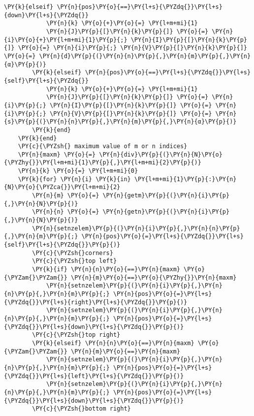 \begin{Verbatim}[commandchars=\\\{\}]
        \PY{k}{elseif} \PY{n}{pos}\PY{o}{==}\PY{l+s}{\PYZdq{}}\PY{l+s}{down}\PY{l+s}{\PYZdq{}}
            \PY{n}{k} \PY{o}{+}\PY{o}{=} \PY{l+m+mi}{1}
            \PY{n}{J}\PY{p}{[}\PY{n}{k}\PY{p}{]} \PY{o}{=} \PY{n}{i}\PY{o}{+}\PY{l+m+mi}{1}\PY{p}{;} \PY{n}{I}\PY{p}{[}\PY{n}{k}\PY{p}{]} \PY{o}{=} \PY{n}{i}\PY{p}{;} \PY{n}{V}\PY{p}{[}\PY{n}{k}\PY{p}{]} \PY{o}{=} \PY{n}{d}\PY{p}{(}\PY{n}{n}\PY{p}{,}\PY{n}{m}\PY{p}{,}\PY{n}{α}\PY{p}{)}
        \PY{k}{elseif} \PY{n}{pos}\PY{o}{==}\PY{l+s}{\PYZdq{}}\PY{l+s}{self}\PY{l+s}{\PYZdq{}}
            \PY{n}{k} \PY{o}{+}\PY{o}{=} \PY{l+m+mi}{1}
            \PY{n}{J}\PY{p}{[}\PY{n}{k}\PY{p}{]} \PY{o}{=} \PY{n}{i}\PY{p}{;} \PY{n}{I}\PY{p}{[}\PY{n}{k}\PY{p}{]} \PY{o}{=} \PY{n}{i}\PY{p}{;} \PY{n}{V}\PY{p}{[}\PY{n}{k}\PY{p}{]} \PY{o}{=} \PY{n}{s}\PY{p}{(}\PY{n}{n}\PY{p}{,}\PY{n}{m}\PY{p}{,}\PY{n}{α}\PY{p}{)}
        \PY{k}{end}
    \PY{k}{end}
    \PY{c}{\PYZsh{} maximum value of m or n indices}
    \PY{n}{maxm} \PY{o}{=} \PY{n}{div}\PY{p}{(}\PY{n}{N}\PY{o}{\PYZhy{}}\PY{l+m+mi}{1}\PY{p}{,}\PY{l+m+mi}{2}\PY{p}{)}
    \PY{n}{k} \PY{o}{=} \PY{l+m+mi}{0}
    \PY{k}{for} \PY{n}{i} \PY{k}{in} \PY{l+m+mi}{1}\PY{p}{:}\PY{n}{N}\PY{o}{\PYZca{}}\PY{l+m+mi}{2}
        \PY{n}{m} \PY{o}{=} \PY{n}{getm}\PY{p}{(}\PY{n}{i}\PY{p}{,}\PY{n}{N}\PY{p}{)}
        \PY{n}{n} \PY{o}{=} \PY{n}{getn}\PY{p}{(}\PY{n}{i}\PY{p}{,}\PY{n}{N}\PY{p}{)}
        \PY{n}{setnzelem}\PY{p}{(}\PY{n}{i}\PY{p}{,}\PY{n}{n}\PY{p}{,}\PY{n}{m}\PY{p}{;} \PY{n}{pos}\PY{o}{=}\PY{l+s}{\PYZdq{}}\PY{l+s}{self}\PY{l+s}{\PYZdq{}}\PY{p}{)}
        \PY{c}{\PYZsh{}corners}
        \PY{c}{\PYZsh{}top left}
        \PY{k}{if} \PY{n}{n}\PY{o}{==}\PY{n}{maxm} \PY{o}{\PYZam{}\PYZam{}} \PY{n}{m}\PY{o}{==}\PY{o}{\PYZhy{}}\PY{n}{maxm}
            \PY{n}{setnzelem}\PY{p}{(}\PY{n}{i}\PY{p}{,}\PY{n}{n}\PY{p}{,}\PY{n}{m}\PY{p}{;} \PY{n}{pos}\PY{o}{=}\PY{l+s}{\PYZdq{}}\PY{l+s}{right}\PY{l+s}{\PYZdq{}}\PY{p}{)}
            \PY{n}{setnzelem}\PY{p}{(}\PY{n}{i}\PY{p}{,}\PY{n}{n}\PY{p}{,}\PY{n}{m}\PY{p}{;} \PY{n}{pos}\PY{o}{=}\PY{l+s}{\PYZdq{}}\PY{l+s}{down}\PY{l+s}{\PYZdq{}}\PY{p}{)}
        \PY{c}{\PYZsh{}top right}
        \PY{k}{elseif} \PY{n}{n}\PY{o}{==}\PY{n}{maxm} \PY{o}{\PYZam{}\PYZam{}} \PY{n}{m}\PY{o}{==}\PY{n}{maxm}
            \PY{n}{setnzelem}\PY{p}{(}\PY{n}{i}\PY{p}{,}\PY{n}{n}\PY{p}{,}\PY{n}{m}\PY{p}{;} \PY{n}{pos}\PY{o}{=}\PY{l+s}{\PYZdq{}}\PY{l+s}{left}\PY{l+s}{\PYZdq{}}\PY{p}{)}
            \PY{n}{setnzelem}\PY{p}{(}\PY{n}{i}\PY{p}{,}\PY{n}{n}\PY{p}{,}\PY{n}{m}\PY{p}{;} \PY{n}{pos}\PY{o}{=}\PY{l+s}{\PYZdq{}}\PY{l+s}{down}\PY{l+s}{\PYZdq{}}\PY{p}{)}
        \PY{c}{\PYZsh{}bottom right}

\end{Verbatim}
